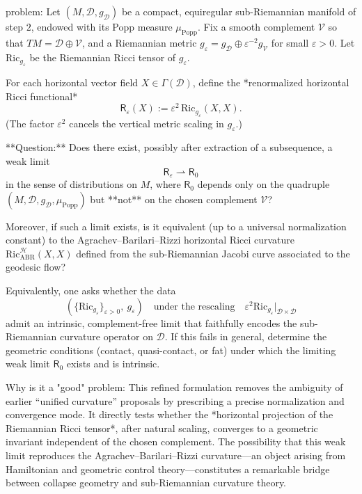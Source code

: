 problem:  
Let \((M,\mathcal{D},g_{\mathcal{D}})\) be a compact, equiregular sub-Riemannian manifold of step \(2\), endowed with its Popp measure \(\mu_{\mathrm{Popp}}\).  
Fix a smooth complement \(\mathcal{V}\) so that \(TM=\mathcal{D}\oplus\mathcal{V}\), and a Riemannian metric \(g_\varepsilon = g_{\mathcal{D}} \oplus \varepsilon^{-2} g_{\mathcal{V}}\) for small \(\varepsilon>0\).  
Let \(\mathrm{Ric}_{g_\varepsilon}\) be the Riemannian Ricci tensor of \(g_\varepsilon\).  

For each horizontal vector field \(X\in\Gamma(\mathcal{D})\), define the *renormalized horizontal Ricci functional*
\[
\mathsf{R}_\varepsilon(X) := \varepsilon^{2}\,\mathrm{Ric}_{g_\varepsilon}(X,X).
\]
(The factor \(\varepsilon^2\) cancels the vertical metric scaling in \(g_\varepsilon\).)  

**Question:**  
Does there exist, possibly after extraction of a subsequence, a weak limit  
\[
\mathsf{R}_\varepsilon \rightharpoonup \mathsf{R}_0
\]
in the sense of distributions on \(M\), where \(\mathsf{R}_0\) depends only on the quadruple \((M,\mathcal{D},g_{\mathcal{D}},\mu_{\mathrm{Popp}})\) but **not** on the chosen complement \(\mathcal{V}\)?  

Moreover, if such a limit exists, is it equivalent (up to a universal normalization constant) to the Agrachev–Barilari–Rizzi horizontal Ricci curvature \(\mathrm{Ric}^{\mathcal{H}}_{\mathrm{ABR}}(X,X)\) defined from the sub-Riemannian Jacobi curve associated to the geodesic flow?  

Equivalently, one asks whether the data
\[
(\{\mathrm{Ric}_{g_\varepsilon}\}_{\varepsilon>0},\ g_\varepsilon)\quad\text{under the rescaling}\quad \varepsilon^2 \mathrm{Ric}_{g_\varepsilon}\Big|_{\mathcal{D}\times\mathcal{D}}
\]
admit an intrinsic, complement-free limit that faithfully encodes the sub-Riemannian curvature operator on \(\mathcal{D}\). If this fails in general, determine the geometric conditions (contact, quasi-contact, or fat) under which the limiting weak limit \(\mathsf{R}_0\) exists and is intrinsic.

Why is it a "good" problem:  
This refined formulation removes the ambiguity of earlier “unified curvature” proposals by prescribing a precise normalization and convergence mode. It directly tests whether the *horizontal projection of the Riemannian Ricci tensor*, after natural scaling, converges to a geometric invariant independent of the chosen complement. The possibility that this weak limit reproduces the Agrachev–Barilari–Rizzi curvature—an object arising from Hamiltonian and geometric control theory—constitutes a remarkable bridge between collapse geometry and sub-Riemannian curvature theory.  

